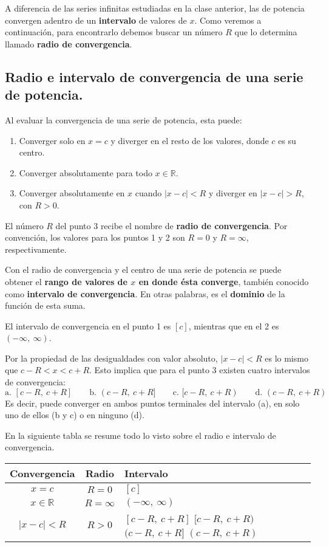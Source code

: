 \documentclass[12pt]{article}
\begin{document}
A diferencia de las series infinitas estudiadas en la clase anterior, las de potencia convergen adentro de un \textbf{intervalo} de valores de $x$. Como veremos a continuación, para encontrarlo debemos buscar un número $R$ que lo determina llamado \textbf{radio de convergencia}.

\subsection{Radio e intervalo de convergencia de una serie de potencia.}

Al evaluar la convergencia de una serie de potencia, esta puede:

\begin{enumerate}
\item Converger solo en $x = c$ y diverger en el resto de los valores, donde $c$ es su centro.
\item Converger absolutamente para todo $x \in \mathbb{R}$.
\item Converger absolutamente en $x$ cuando $|x - c| < R$ y diverger en $|x - c| > R$, con $R > 0$.
\end{enumerate}

El número $R$ del punto 3 recibe el nombre de \textbf{radio de convergencia}. Por convención, los valores para los puntos 1 y 2 son $R = 0$ y $R = \infty$, respectivamente.

Con el radio de convergencia y el centro de una serie de potencia se puede obtener el \textbf{rango de valores de $x$ en donde ésta converge}, también conocido como \textbf{intervalo de convergencia}. En otras palabras, es el \textbf{dominio} de la función de esta suma.

El intervalo de convergencia en el punto 1 es $[c]$, mientras que en el 2 es $(-\infty, \ \infty)$.

Por la propiedad de las desigualdades con valor absoluto, $|x - c| < R$ es lo mismo que $c - R < x < c + R$. Esto implica que para el punto 3 existen cuatro intervalos de convergencia:
\[
  \text{a. } [c - R, \ c + R] \qquad
  \text{b. } (c - R, \ c + R] \qquad
  \text{c. } [c - R, \ c + R) \qquad
  \text{d. } (c - R, \ c + R)
\]
Es decir, puede converger en ambos puntos terminales del intervalo (a), en solo uno de ellos (b y c) o en ninguno (d).

En la siguiente tabla se resume todo lo visto sobre el radio e intervalo de convergencia.

\begin{table}[hbt!]
\centering

{\renewcommand{\arraystretch}{1.3}
\begin{tabular}{c c p{3cm}}
\hline\hline
Convergencia & Radio & Intervalo \\
\hline\hline
$x = c$ & $R = 0$ & $[c]$ \\
$x \in \mathbb{R}$ & $R = \infty$ & $(-\infty, \ \infty)$ \\
$|x - c| < R$ & $R > 0$ & $[c - R, \ c + R]$ $[c - R, \ c + R)$ $(c - R, \ c + R]$ $(c - R, \ c + R)$ \\
\hline\hline
\end{tabular}
}

\end{table}
\end{document}
